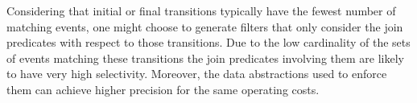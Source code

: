 Considering that initial or final transitions typically have the fewest
number of matching events, one might choose to generate filters that only
consider the join predicates with respect to those transitions.
Due to the low cardinality of the sets of events matching these transitions 
the join predicates involving them are likely to have very high selectivity.
Moreover, the data abstractions used to enforce them can achieve higher
precision for the same operating costs.












 
